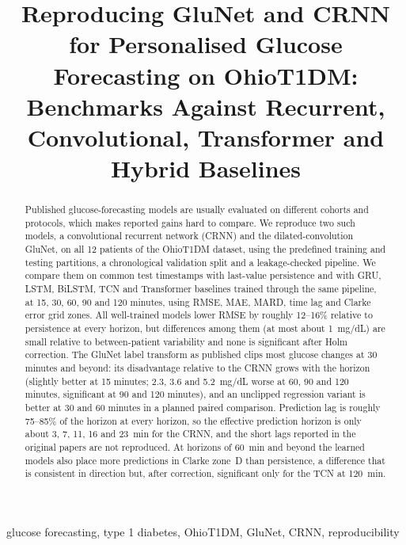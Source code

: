 \documentclass[conference]{IEEEtran}
\begin{document}
\title{Reproducing GluNet and CRNN for Personalised Glucose Forecasting on OhioT1DM: Benchmarks Against Recurrent, Convolutional, Transformer and Hybrid Baselines}
\author{}
\maketitle

\begin{abstract}
Published glucose-forecasting models are usually evaluated on different cohorts and protocols, which makes reported gains hard to compare. We reproduce two such models, a convolutional recurrent network (CRNN) and the dilated-convolution GluNet, on all 12 patients of the OhioT1DM dataset, using the predefined training and testing partitions, a chronological validation split and a leakage-checked pipeline. We compare them on common test timestamps with last-value persistence and with GRU, LSTM, BiLSTM, TCN and Transformer baselines trained through the same pipeline, at 15, 30, 60, 90 and 120 minutes, using RMSE, MAE, MARD, time lag and Clarke error grid zones. All well-trained models lower RMSE by roughly 12--16\% relative to persistence at every horizon, but differences among them (at most about 1~mg/dL) are small relative to between-patient variability and none is significant after Holm correction. The GluNet label transform as published clips most glucose changes at 30 minutes and beyond: its disadvantage relative to the CRNN grows with the horizon (slightly better at 15 minutes; 2.3, 3.6 and 5.2~mg/dL worse at 60, 90 and 120 minutes, significant at 90 and 120 minutes), and an unclipped regression variant is better at 30 and 60 minutes in a planned paired comparison. Prediction lag is roughly 75--85\% of the horizon at every horizon, so the effective prediction horizon is only about 3, 7, 11, 16 and 23~min for the CRNN, and the short lags reported in the original papers are not reproduced. At horizons of 60~min and beyond the learned models also place more predictions in Clarke zone~D than persistence, a difference that is consistent in direction but, after correction, significant only for the TCN at 120~min.
\end{abstract}
\begin{IEEEkeywords}
glucose forecasting, type 1 diabetes, OhioT1DM, GluNet, CRNN, reproducibility
\end{IEEEkeywords}
\end{document}
